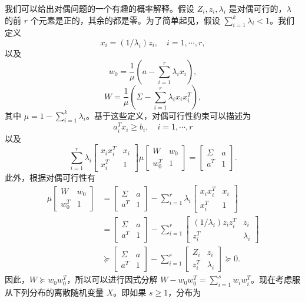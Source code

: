 \documentclass[UTF8,12pt,a4paper,fontset=fandol]{ctexart}
\begin{document}
我们可以给出对偶问题的一个有趣的概率解释。假设 $Z_i,z_i,\lambda_i$ 是对偶可行的，$\lambda$ 的前 $r$ 个元素是正的，其余的都是零。为了简单起见，假设 $\sum_{i=1}^k\lambda_i<1$。我们定义
\[
x_i=(1/\lambda_i)z_i,\quad i=1,\cdots,r,
\]
以及
\[
w_0=\frac{1}{\mu}\left(a-\sum_{i=1}^r\lambda_ix_i\right),
\]
\[
W=\frac{1}{\mu}\left(\Sigma-\sum_{i=1}^r\lambda_ix_ix_i^T\right),
\]
其中 $\mu=1-\sum_{i=1}^k\lambda_i$。基于这些定义，对偶可行性约束可以描述为
\[
a_i^Tx_i\geq b_i,\quad i=1,\cdots,r
\]
以及
\[
\sum_{i=1}^r\lambda_i
\begin{bmatrix}
x_ix_i^T & x_i\\
x_i^T & 1
\end{bmatrix}
\mu
\begin{bmatrix}
W & w_0\\
w_0^T & 1
\end{bmatrix}
=
\begin{bmatrix}
\Sigma & a\\
a^T & 1
\end{bmatrix}.
\]
此外，根据对偶可行性有
\[
\begin{aligned}
\mu
\begin{bmatrix}
W & w_0\\
w_0^T & 1
\end{bmatrix}
&=
\begin{bmatrix}
\Sigma & a\\
a^T & 1
\end{bmatrix}
-\sum_{i=1}^r\lambda_i
\begin{bmatrix}
x_ix_i^T & x_i\\
x_i^T & 1
\end{bmatrix}\\
&=
\begin{bmatrix}
\Sigma & a\\
a^T & 1
\end{bmatrix}
-\sum_{i=1}^r
\begin{bmatrix}
(1/\lambda_i)z_iz_i^T & z_i\\
z_i^T & \lambda_i
\end{bmatrix}\\
&\succeq
\begin{bmatrix}
\Sigma & a\\
a^T & 1
\end{bmatrix}
-\sum_{i=1}^r
\begin{bmatrix}
Z_i & z_i\\
z_i^T & \lambda_i
\end{bmatrix}
\succeq 0.
\end{aligned}
\]
因此，$W\succeq w_0w_0^T$，所以可以进行因式分解 $W-w_0w_0^T=\sum_{i=1}^s w_iw_i^T$。现在考虑服从下列分布的离散随机变量 $X$。即如果 $s\geq 1$，分布为
\end{document}
